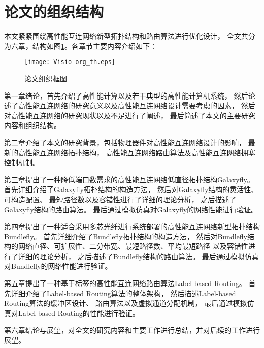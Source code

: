 \section{论文的组织结构}

本文紧紧围绕高性能互连网络新型拓扑结构和路由算法进行优化设计，
全文共分为六章，结构如图\ref{orgth}。各章节主要内容介绍如下：

\begin{figure}[htp]
\centering
\texttt{[image: Visio-org\_th.eps]}
\caption{论文组织框图}
\label{orgth}
\end{figure}

第一章绪论，首先介绍了高性能计算以及若干典型的高性能计算机系统，
然后论述了高性能互连网络的研究意义以及高性能互连网络设计需要考虑的因素，
然后对高性能互连网络的研究现状以及不足进行了阐述，
最后简述了本文的主要研究内容和组织结构。

第二章介绍了本文的研究背景，包括物理器件对高性能互连网络设计的影响，
最新的高性能互连网络拓扑结构，
高性能互连网络路由算法及高性能互连网络拥塞控制机制。

第三章提出了一种降低端口数需求的高性能互连网络低直径拓扑结构Galaxyfly。
首先详细介绍了Galaxyfly拓扑结构的构造方法，
然后对Galaxyfly结构的灵活性、可构造配置、
最短路径数以及容错性进行了详细的理论分析，
之后描述了Galaxyfly结构的路由算法。
最后通过模拟仿真对Galaxyfly的网络性能进行验证。

第四章提出了一种适合采用多芯光纤进行系统部署的高性能互连网络新型拓扑结构Bundlefly。
首先详细介绍了Bundlefly拓扑结构的构造方法，
然后对Bundlefly结构的网络直径、可扩展性、二分带宽、最短路径数、平均最短路径
以及容错性进行了详细的理论分析，
之后描述了Bundlefly结构的路由算法。
最后通过模拟仿真对Bundlefly的网络性能进行验证。

第五章提出了一种基于标签的高性能互连网络路由算法Label-based Routing。
首先详细介绍了Label-based Routing算法的整体架构，
然后描述Label-based Routing算法的缓冲区设计、
路由算法以及虚拟通道分配机制，
最后通过模拟仿真对Label-based Routing的性能进行验证。

第六章结论与展望，对全文的研究内容和主要工作进行总结，并对后续的工作进行展望。
